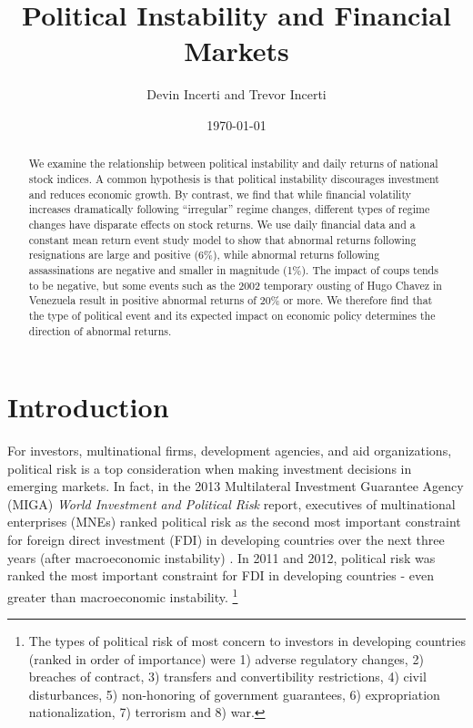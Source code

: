 \documentclass[12pt,final,fleqn]{article}
\theoremstyle{plain}
\begin{document}
\author{Devin Incerti and Trevor Incerti}
\title{\textbf{Political Instability and Financial Markets}}
\date{\today}
\maketitle

\singlespacing
\begin{abstract}
We examine the relationship between political instability and daily returns of national stock indices. A common hypothesis is that political instability discourages investment and reduces economic growth. By contrast, we find that while financial volatility increases dramatically following ``irregular'' regime changes, different types of regime changes have disparate effects on stock returns. We use daily financial data and a constant mean return event study model to show that abnormal returns following resignations are large and positive (6\%), while abnormal returns following assassinations are negative and smaller in magnitude (1\%). The impact of coups tends to be negative, but some events such as the 2002 temporary ousting of Hugo Chavez in Venezuela result in positive abnormal returns of 20\% or more. We therefore find that the type of political event and its expected impact on economic policy determines the direction of abnormal returns.
\end{abstract}
\doublespacing

\section{Introduction} \label{sec:Introduction}
For investors, multinational firms, development agencies, and aid organizations, political risk is a top consideration when making investment decisions in emerging markets. In fact, in the 2013 Multilateral Investment Guarantee Agency (MIGA) \textit{World Investment and Political Risk} report, executives of multinational enterprises (MNEs) ranked political risk as the second most important constraint for foreign direct investment (FDI) in developing countries over the next three years (after macroeconomic instability) \citep{wipr2013}. In 2011 and 2012, political risk was ranked the most important constraint for FDI in developing countries - even greater than macroeconomic instability. \footnote{The types of political risk of most concern to investors in developing countries (ranked in order of importance) were 1) adverse regulatory changes, 2) breaches of contract, 3) transfers and convertibility restrictions, 4) civil disturbances, 5) non-honoring of government guarantees, 6) expropriation nationalization, 7) terrorism and 8) war.}
\end{document}
